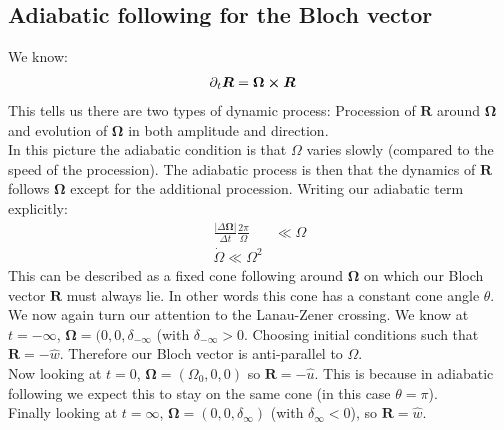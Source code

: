 \subsection{Adiabatic following for the Bloch vector}
We know:
\begin{align*}
	\partial_t \bm{R} &= \bm{\Omega}\cross\bm{R}
\end{align*}
This tells us there are two types of dynamic process: Procession of $\bm{R}$ around $\bm{\Omega}$ and evolution of $\bm{\Omega}$ in both amplitude and direction. \\
In this picture the adiabatic condition is that $\Omega$ varies slowly (compared to the speed of the procession). The adiabatic process is then that the dynamics of $\bm{R}$ follows $\bm{\Omega}$ except for the additional procession. Writing our adiabatic term explicitly:
\begin{align*}
	\frac{|\Delta\bm{\Omega}|}{\Delta t} \frac{2\pi}{\Omega} & \ll \Omega \\
	\dot{\Omega} \ll \Omega^2
\end{align*}
This can be described as a fixed cone following around $\bm{\Omega}$ on which our Bloch vector $\bm{R}$ must always lie. In other words this cone has a constant cone angle $\theta$. \\
We now again turn our attention to the Lanau-Zener crossing. We know at $t=-\infty$, $\bm{\Omega} = (0,0, \delta_{-\infty}$ (with $\delta_{-\infty} > 0$. Choosing initial conditions such that $\bm{R} = -\hat{w}$. Therefore our Bloch vector is anti-parallel to $\Omega$.\\
Now looking at $t=0$, $\bm{\Omega} = (\Omega_0,0,0)$ so $\bm{R} = -\hat{u}$. This is because in adiabatic following we expect this to stay on the same cone (in this case $\theta = \pi$).\\
Finally looking at $t=\infty$, $\bm{\Omega} = (0,0,\delta_\infty)$ (with $\delta_\infty < 0$), so $\bm{R} = \hat{w}$.
